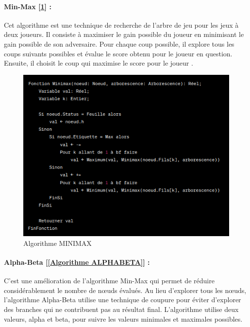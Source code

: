 \documentclass[12pt]{article}
\begin{document}
	    \paragraph{Min-Max [\ref{Algorithme MINIMAX}] :} Cet algorithme est une technique de recherche de l'arbre de jeu pour les jeux à deux joueurs. Il consiste à maximiser le gain possible du joueur en minimisant le gain possible de son adversaire. Pour chaque coup possible, il explore tous les coups suivants possibles et évalue le score obtenu pour le joueur en question. Ensuite, il choisit le coup qui maximise le score pour le joueur .
	    
	    
	    
	    \begin{figure}[H]
	    	\centering
	    	\includegraphics[scale=0.55]{img/minimax}
	    	\caption{Algorithme MINIMAX }
	    	\label{Algorithme MINIMAX}
	    \end{figure}
	
	\paragraph{Alpha-Beta [\ref{Algorithme ALPHABETA}] :} C'est une amélioration de l'algorithme Min-Max qui permet de réduire considérablement le nombre de nœuds évalués. Au lieu d'explorer tous les nœuds, l'algorithme Alpha-Beta utilise une technique de coupure pour éviter d'explorer des branches qui ne contribuent pas au résultat final. L'algorithme utilise deux valeurs, alpha et beta, pour suivre les valeurs minimales et maximales possibles.
	
\end{document}
